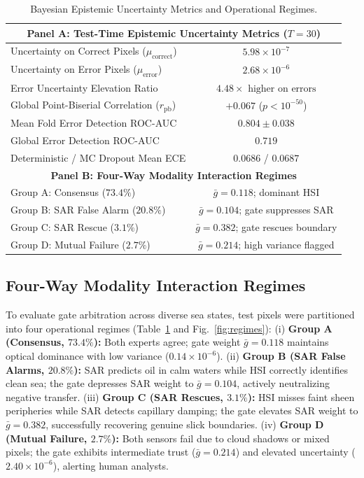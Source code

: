 \documentclass[conference]{IEEEtran}
\begin{document}
\begin{table}[!ht]
\centering
\caption{Bayesian Epistemic Uncertainty Metrics and Operational Regimes.}
\label{tab:unified_uncertainty}
\renewcommand{\arraystretch}{1.03}
\setlength{\tabcolsep}{3pt}
\scriptsize
\begin{tabularx}{\columnwidth}{X|c}
\hline
\multicolumn{2}{c}{\textbf{Panel A: Test-Time Epistemic Uncertainty Metrics ($T = 30$)}} \\
\hline
Uncertainty on Correct Pixels ($\mu_{\text{correct}}$) & $5.98 \times 10^{-7}$ \\
Uncertainty on Error Pixels ($\mu_{\text{error}}$) & $2.68 \times 10^{-6}$ \\
Error Uncertainty Elevation Ratio & $\mathbf{4.48\times} \text{ higher on errors}$ \\
Global Point-Biserial Correlation ($r_{\text{pb}}$) & $+0.067$ ($p < 10^{-50}$) \\
Mean Fold Error Detection ROC-AUC & $\mathbf{0.804 \pm 0.038}$ \\
Global Error Detection ROC-AUC & $0.719$ \\
Deterministic / MC Dropout Mean ECE & $0.0686$ / $0.0687$ \\
\hline
\multicolumn{2}{c}{\textbf{Panel B: Four-Way Modality Interaction Regimes}} \\
\hline
Group A: Consensus ($73.4\%$) & $\bar{g}=0.118$; dominant HSI \\
Group B: SAR False Alarm ($20.8\%$) & $\bar{g}=0.104$; gate suppresses SAR \\
Group C: SAR Rescue ($3.1\%$) & $\bar{g}=0.382$; gate rescues boundary \\
Group D: Mutual Failure ($2.7\%$) & $\bar{g}=0.214$; high variance flagged \\
\hline
\end{tabularx}
\end{table}

\subsection{Four-Way Modality Interaction Regimes}
To evaluate gate arbitration across diverse sea states, test pixels were partitioned into four operational regimes (Table~\ref{tab:unified_uncertainty} and Fig.~\ref{fig:regimes}):
(i) \textbf{Group A (Consensus, $73.4\%$):} Both experts agree; gate weight $\bar{g} = 0.118$ maintains optical dominance with low variance ($0.14 \times 10^{-6}$).
(ii) \textbf{Group B (SAR False Alarms, $20.8\%$):} SAR predicts oil in calm waters while HSI correctly identifies clean sea; the gate depresses SAR weight to $\bar{g} = 0.104$, actively neutralizing negative transfer.
(iii) \textbf{Group C (SAR Rescues, $3.1\%$):} HSI misses faint sheen peripheries while SAR detects capillary damping; the gate elevates SAR weight to $\bar{g} = 0.382$, successfully recovering genuine slick boundaries.
(iv) \textbf{Group D (Mutual Failure, $2.7\%$):} Both sensors fail due to cloud shadows or mixed pixels; the gate exhibits intermediate trust ($\bar{g} = 0.214$) and elevated uncertainty ($2.40 \times 10^{-6}$), alerting human analysts.
\end{document}
